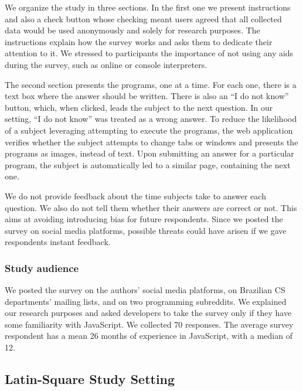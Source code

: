 We organize the study in three sections. In the first one we present instructions and also a check button whose checking meant users agreed that all collected data would be used anonymously and solely for research purposes. The instructions explain how the survey works and asks them to dedicate their attention to it.  We stressed to participants the importance of not using any aids during the survey, such as online or console interpreters. 

The second section presents the programs, one at a time. For each one, there is a text box where the answer should be written. There is also an ``I do not know'' button, which, when clicked, leads the subject to the next question. In our setting, ``I do not know'' was treated as a wrong answer. To reduce the likelihood of a subject leveraging attempting to execute the programs, the web application verifies whether the subject attempts to change tabs or windows and presents the programs as images, instead of text. Upon submitting an answer for a particular program, the subject is automatically led to a similar page, containing the next one.

We do not provide feedback about the time subjects take to answer each question. We also do not tell them whether their answers are correct or not. This aims at avoiding introducing bias for future respondents. Since we posted the survey on social media platforms, possible threats could have arisen if we gave respondents instant feedback.


\subsubsection*{Study audience}

We posted the survey on the authors' social media platforms, on Brazilian CS departments' mailing lists, and on two programming subreddits. We explained our research purposes and asked developers to take the survey only if they have some familiarity with JavaScript. We collected 70 responses. The average survey respondent has a mean 26 months of experience in JavaScript, with a median of 12. 


\subsection{Latin-Square Study Setting}\label{sec:meth:survey}

